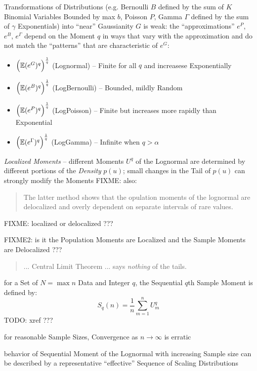 Transformations of Distributions (e.g. Bernoulli $B$ defined by the sum of $K$
Binomial Variables Bounded by max $b$, Poisson $P$, Gamma $\Gamma$ defined by
the sum of $\gamma$ Exponentials) into ``near'' Gaussianity $G$ is weak: the
``approximations'' $e^P$, $e^B$, $e^\Gamma$ depend on the Moment $q$ in ways
that vary with the approximation and do not match the ``patterns'' that are
characteristic of $e^G$:
\begin{itemize}
  \item $\Big(\mathbb{E}(e^G)^q\Big)^\frac{1}{q}$ (Lognormal) -- Finite for all $q$
    and increasese Exponentially
  \item $\Big(\mathbb{E}(e^B)^q\Big)^\frac{1}{q}$ (LogBernoulli) -- Bounded, mildly
    Random
  \item $\Big(\mathbb{E}(e^P)^q\Big)^\frac{1}{q}$ (LogPoisson) -- Finite but
    increases more rapidly than Exponential
  \item $\Big(\mathbb{E}(e^\Gamma)^q\Big)^\frac{1}{q}$ (LogGamma) -- Infinite when
    $q > \alpha$
\end{itemize}

\emph{Localized Moments} -- different Moments $U^q$ of the Lognormal are
determined by different portions of the \emph{Density} $p(u)$; small changes in
the Tail of $p(u)$ can strongly modify the Moments
FIXME: also:
\begin{quote}
  The latter method shows that the opulation moments of the lognormal are
  delocalized and overly dependent on separate intervals of rare values.
\end{quote}
FIXME: localized or delocalized ???

FIXME2: is it the Population Moments are Localized and the Sample Moments are
Delocalized ???

\begin{quote}
  ... Central Limit Theorem ... says \emph{nothing} of the tails.
\end{quote}

for a Set of $N = \max n$ Data and Integer $q$, the Sequential $q$th Sample
Moment is defined by:
\[
  S_q(n) = \frac{1}{n} \sum_{m = 1}^n U_m^q
\]
TODO: xref ???

for reasonable Sample Sizes, Convergence as $n \to \infty$ is erratic

behavior of Sequential Moment of the Lognormal with increasing Sample size can
be described by a representative ``effective'' Sequence of Scaling Distributions



